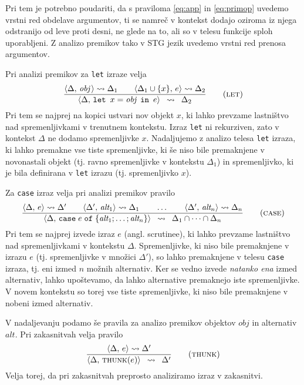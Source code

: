 Pri tem je potrebno poudariti, da s praviloma \ref{eq:app} in \ref{eq:primop} uvedemo vrstni red obdelave argumentov, ti se namreč v kontekst dodajo oziroma iz njega odstranijo od leve proti desni, ne glede na to, ali so v telesu funkcije sploh uporabljeni. Z analizo premikov tako v STG jezik uvedemo vrstni red prenosa argumentov.

Pri analizi premikov za \texttt{let} izraze velja
\begin{equation}
\infers[let]{
    \langle \Delta , \, \textit{obj} \, \rangle \leadsto \Delta_1
    \qquad
    \langle \Delta_1 \cup \{ x \} , \, e \rangle \leadsto \Delta_2
}{
    \langle \Delta , \, \texttt{let} \enspace x = \textit{obj} \enspace \texttt{in} \enspace e \rangle
}{
	\Delta_2
}
\label{eq:let}
\end{equation}
Pri tem se najprej na kopici ustvari nov objekt $x$, ki lahko prevzame lastništvo nad spremenljivkami v trenutnem kontekstu. Izraz \texttt{let} ni rekurziven, zato v kontekst $\Delta$ ne dodamo spremenljivke $x$. Nadaljujemo z analizo telesa \texttt{let} izraza, ki lahko premakne vse tiste spremenljivke, ki še niso bile premaknjene v novonastali objekt (tj. ravno spremenljivke v kontekstu $\Delta_1$) in spremenljivko, ki je bila definirana v \texttt{let} izrazu (tj. spremenljivko $x$).

Za \texttt{case} izraz velja pri analizi premikov pravilo
\begin{equation}
\infers[case]{
    \langle \Delta , \, e \rangle \leadsto \Delta' \qquad \langle \Delta' , \, \textit{alt}_1 \rangle \leadsto \Delta_1 \qquad \dots \qquad \langle \Delta' , \, \textit{alt}_n \rangle \leadsto \Delta_n
}{
    \langle \Delta , \, \texttt{case} \; e \; \texttt{of} \; \{ \textit{alt}_1; \dots; \textit{alt}_n \} \rangle
}{
	\Delta_1 \cap \dots \cap \Delta_n
}
\label{eq:case}
\end{equation}
Pri tem se najprej izvede izraz $e$ (angl. scrutinee), ki lahko prevzame lastništvo nad spremenljivkami v kontekstu $\Delta$. Spremenljivke, ki niso bile premaknjene v izrazu $e$ (tj. spremenljivke v množici $\Delta'$), so lahko premaknjene v telesu \texttt{case} izraza, tj. eni izmed $n$ možnih alternativ. Ker se vedno izvede \emph{natanko ena} izmed alternativ, lahko upoštevamo, da lahko alternative premaknejo iste spremenljivke. V novem kontekstu so torej vse tiste spremenljivke, ki niso bile premaknjene v nobeni izmed alternativ.

V nadaljevanju podamo še pravila za analizo premikov objektov $obj$ in alternativ $alt$. Pri zakasnitvah  velja pravilo
\begin{equation}
\infers[thunk]{
    \langle \Delta , \, e \rangle \leadsto \Delta'
}{
    \langle \Delta , \, \object{thunk}(e) \rangle
}{
	\Delta'
}
\label{eq:thunk}
\end{equation}
Velja torej, da pri zakasnitvah preprosto analiziramo izraz v zakasnitvi.

